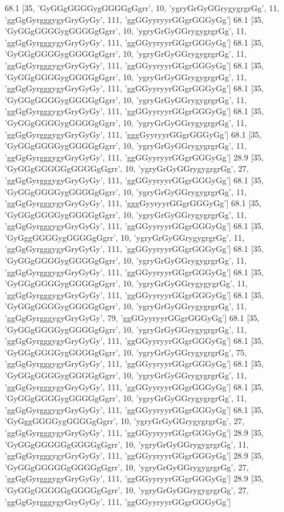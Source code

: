 68.1 [35, 'GyGGgGGGGygGGGGgGgrr', 10, 'ygryGrGyGGrygygrgrGg', 11, 'ggGgGyrgggygyGryGyGy', 111, 'ggGGyyryyrGGgrGGGyGg']
68.1 [35, 'GyGGgGGGGygGGGGgGgrr', 10, 'ygryGrGyGGrygygrgrGg', 11, 'ggGgGyrgggygyGryGyGy', 111, 'ggGGyyryyrGGgrGGGyGg']
68.1 [35, 'GyGGgGGGGygGGGGgGgrr', 10, 'ygryGrGyGGrygygrgrGg', 11, 'ggGgGyrgggygyGryGyGy', 111, 'ggGGyyryyrGGgrGGGyGg']
68.1 [35, 'GyGGgGGGGygGGGGgGgrr', 10, 'ygryGrGyGGrygygrgrGg', 11, 'ggGgGyrgggygyGryGyGy', 111, 'ggGGyyryyrGGgrGGGyGg']
68.1 [35, 'GyGGgGGGGygGGGGgGgrr', 10, 'ygryGrGyGGrygygrgrGg', 11, 'ggGgGyrgggygyGryGyGy', 111, 'ggGGyyryyrGGgrGGGyGg']
68.1 [35, 'GyGGgGGGGygGGGGgGgrr', 10, 'ygryGrGyGGrygygrgrGg', 11, 'ggGgGyrgggygyGryGyGy', 111, 'gggGyyryyrGGgrGGGyGg']
68.1 [35, 'GyGGgGGGGygGGGGgGgrr', 10, 'ygryGrGyGGrygygrgrGg', 11, 'ggGgGyrgggygyGryGyGy', 111, 'ggGGyyryyrGGgrGGGyGg']
28.9 [35, 'GyGGgGGGGGgGGGGgGgrr', 10, 'ygryGrGyGGrygygrgrGg', 27, 'ggGgGyrgggygyGryGyGy', 111, 'ggGGyyryyrGGgrGGGyGg']
68.1 [35, 'GyGGgGGGGygGGGGgGgrr', 10, 'ygryGrGyGGrygygrgrGg', 11, 'ggGgGyrgggygyGryGyGy', 111, 'gggGyyryyrGGgrGGGyGg']
68.1 [35, 'GyGGgGGGGygGGGGgGgrr', 10, 'ygryGrGyGGrygygrgrGg', 11, 'ggGgGyrgggygyGryGyGy', 111, 'ggGGyyryyrGGgrGGGyGg']
68.1 [35, 'GyGggGGGGygGGGGgGgrr', 10, 'ygryGrGyGGrygygrgrGg', 11, 'ggGgGyrgggygyGryGyGy', 111, 'ggGGyyryyrGGgrGGGyGg']
68.1 [35, 'GyGGgGGGGygGGGGgGgrr', 10, 'ygryGrGyGGrygygrgrGg', 11, 'ggGgGyrgggygyGryGyGy', 111, 'ggGGyyryyrGGgrGGGyGg']
68.1 [35, 'GyGGgGGGGygGGGGgGgrr', 10, 'ygryGrGyGGrygygygrGg', 11, 'ggGgGyrgggygyGryGyGy', 111, 'ggGGyyryyrGGgrGGGyGg']
68.1 [35, 'GyGGgGGGGygGGGGgGgrr', 10, 'ygryGrGyGGrygygrgrGg', 11, 'ggGgGyrgggygyGryGyGy', 79, 'ggGGyyryyrGGgrGGGyGg']
68.1 [35, 'GyGGgGGGGygGGGGgGgrr', 10, 'ygryGrGyGGrygygrgrGg', 11, 'ggGgGyrgggygyGryGyGy', 111, 'ggGGyyryyrGGgrGGGyGg']
68.1 [35, 'GyGGgGGGGygGGGGgGgrr', 10, 'ygryGrGyGGrygygrgrGg', 75, 'ggGgGyrgggygyGryGyGy', 111, 'ggGGyyryyrGGgrGGGyGg']
68.1 [35, 'GyGGgGGGGygGGGGgGgrr', 10, 'ygryGrGyGGrygygrgrGg', 11, 'ggGgGyrgggygyGryGyGy', 111, 'ggGGyyryyrGGgrGGGyGg']
68.1 [35, 'GyGGgGGGGygGGGGgGgrr', 10, 'ygryGrGyGGrygygrgrGg', 11, 'ggGgGyrgggygyGryGyGy', 111, 'ggGGyyryyrGGgrGGGyGg']
68.1 [35, 'GyGggGGGGygGGGGgGgrr', 10, 'ygryGrGyGGrygygrgrGg', 27, 'ggGgGyrgggygyGryGyGy', 111, 'ggGGyyryyrGGgrGGGyGg']
28.9 [35, 'GyGGgGGGGGgGGGGgGgrr', 10, 'ygryGrGyGGrygygrgrGg', 11, 'ggGgGyrgggygyGryGyGy', 111, 'ggGGyyryyrGGgrGGGyGg']
28.9 [35, 'GyGGgGGGGGgGGGGgGgrr', 10, 'ygryGrGyGGrygygrgrGg', 27, 'ggGgGyrgggygyGryGyGy', 111, 'ggGGyyryyrGGgrGGGyGg']
28.9 [35, 'GyGGgGGGGGgGGGGgGgrr', 10, 'ygryGrGyGGrygygrgrGg', 27, 'ggGgGyrgggygyGryGyGy', 111, 'ggGGyyryyrGGgrGGGyGg']
